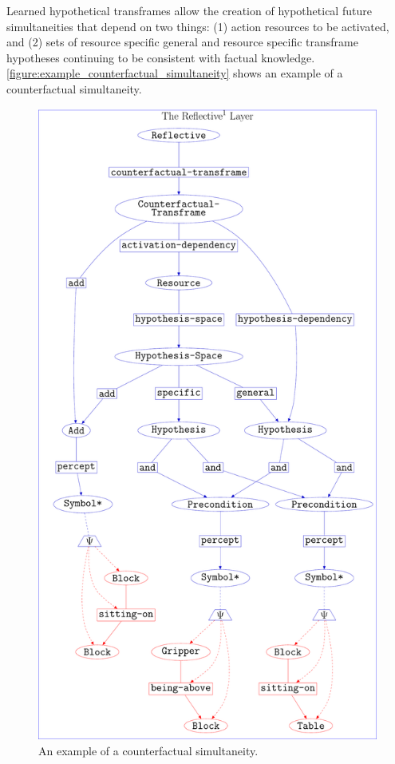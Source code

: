 Learned hypothetical transframes allow the creation of hypothetical
future simultaneities that depend on two things: (1) action resources
to be activated, and (2) sets of resource specific general and
resource specific transframe hypotheses continuing to be consistent
with factual knowledge.
{\mbox{\autoref{figure:example_counterfactual_simultaneity}}} shows an
example of a counterfactual simultaneity.
\begin{figure}
\center
\includegraphics[width=12cm]{gfx/example_counterfactual_simultaneity}
\caption[An example of a counterfactual simultaneity.]{An example of a
  counterfactual simultaneity.}
\label{figure:example_counterfactual_simultaneity}
\end{figure}


